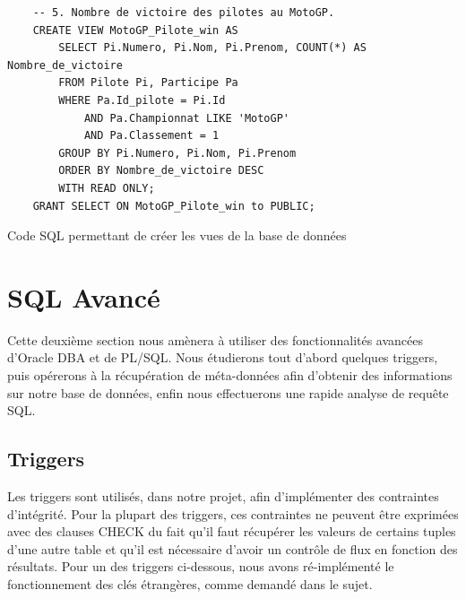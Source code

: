 \documentclass[12pt,a4paper]{article}
\newenvironment{code}{\captionsetup{type=listing}}{}
\begin{document}
\begin{code}
\begin{verbatim}
    -- 5. Nombre de victoire des pilotes au MotoGP.
    CREATE VIEW MotoGP_Pilote_win AS
        SELECT Pi.Numero, Pi.Nom, Pi.Prenom, COUNT(*) AS Nombre_de_victoire
        FROM Pilote Pi, Participe Pa
        WHERE Pa.Id_pilote = Pi.Id
            AND Pa.Championnat LIKE 'MotoGP'
            AND Pa.Classement = 1
        GROUP BY Pi.Numero, Pi.Nom, Pi.Prenom
        ORDER BY Nombre_de_victoire DESC
        WITH READ ONLY;
    GRANT SELECT ON MotoGP_Pilote_win to PUBLIC;
    \end{verbatim}
    \caption{Code SQL permettant de créer les vues de la base de données}
    \label{lst.create}
\end{code}

\section{SQL Avancé}
\label{sec.reference}

Cette deuxième section nous amènera à utiliser des fonctionnalités avancées
d’Oracle DBA et de PL/SQL. Nous étudierons tout d’abord quelques triggers, puis
opérerons à la récupération de méta-données afin d’obtenir des informations sur
notre base de données, enfin nous effectuerons une rapide analyse de requête
SQL.

\subsection{Triggers}
\label{sub.trig}

Les triggers sont utilisés, dans notre projet, afin d'implémenter des
contraintes d'intégrité. Pour la plupart des triggers, ces contraintes ne
peuvent être exprimées avec des clauses CHECK du fait qu’il faut  récupérer les
valeurs de certains tuples d’une autre table et qu’il est nécessaire d’avoir un
contrôle de flux en fonction des résultats. Pour un des triggers ci-dessous,
nous avons ré-implémenté le fonctionnement des clés étrangères, comme demandé
dans le sujet.
\end{document}

